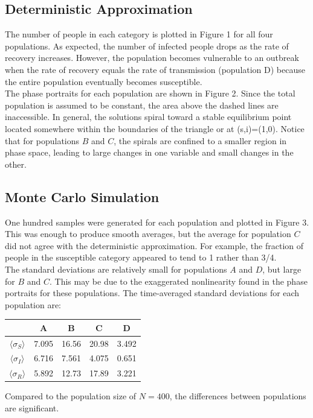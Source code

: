 \documentclass[prb,aps,twocolumn,showpacs,10pt]{revtex4-1}
\begin{document}
\subsection{Deterministic Approximation}
The number of people in each category is plotted in Figure 1 for all four populations. As expected, the number of infected people drops as the rate of recovery increases. However, the population becomes vulnerable to an outbreak when the rate of recovery equals the rate of transmission (population D) because the entire population eventually becomes susceptible. \\

The phase portraits for each population are shown in Figure 2. Since the total population is assumed to be constant, the area above the dashed lines are inaccessible. In general, the solutions spiral toward a stable equilibrium point located somewhere within the boundaries of the triangle or at (s,i)=(1,0). Notice that for populations $B$ and $C$, the spirals are confined to a smaller region in phase space, leading to large changes in one variable and small changes in the other. \\

\subsection{Monte Carlo Simulation}

One hundred samples were generated for each population and plotted in Figure 3. This was enough to produce smooth averages, but the average for population $C$ did not agree with the deterministic approximation. For example, the fraction of people in the susceptible category appeared to tend to 1 rather than 3/4.\\

The standard deviations are relatively small for populations $A$ and $D$, but large for $B$ and $C$. This may be due to the exaggerated nonlinearity found in the phase portraits for these populations. The time-averaged standard deviations for each population are:
\begin{center}
\begin{tabular}{|c|c|c|c|c|}
\hline
&A&B&C&D\\
\hline
\hline
$\langle \sigma_S \rangle$ &7.095&16.56&20.98&3.492\\
\hline
$\langle \sigma_I \rangle$&6.716&7.561&4.075&0.651\\
\hline
$\langle \sigma_R \rangle$&5.892&12.73&17.89&3.221\\
\hline
\end{tabular}
\end{center}
Compared to the population size of $N=400$, the differences between populations are significant.
\end{document}
